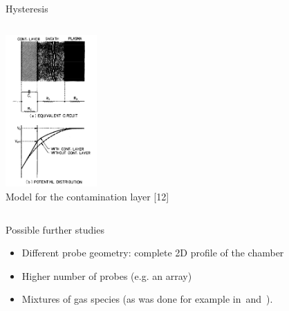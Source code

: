 \documentclass[10pt]{beamer}
\begin{document}
\begin{frame}{Hysteresis}
\begin{columns}[b]
        \begin{center}
            \includegraphics[width=3.5cm]{../figures/contamination_layer.png}\\
            \small Model for the contamination layer [12]
        \end{center}
        
    \end{columns}

\end{frame}


\begin{frame}{Possible further studies}
    \begin{itemize}
        \item Different probe geometry: complete 2D profile of the chamber
        \item Higher number of probes (e.g. an array)
        \item Mixtures of gas species (as was done for example in\,  and\, ).
    \end{itemize}
\end{frame}
\end{document}
